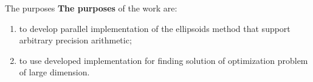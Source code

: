 \begin{frame}{The purposes}
\textbf{
The purposes} of the work are:
\begin{enumerate}
\item to develop parallel implementation of the ellipsoids method that support arbitrary precision arithmetic;
\item 
to use developed implementation for finding solution of optimization problem of large dimension.
\end{enumerate}
\end{frame}